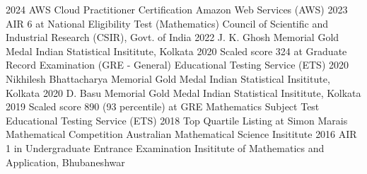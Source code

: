 \documentclass[9pt]{developercv} %
\begin{document}
\begin{entrylist}
    \vspace*{-0.5cm}
    \entry
    {2024}
    {AWS Cloud Practitioner Certification}
    {Amazon Web Services (AWS)}
    {}
    \vspace*{-0.5cm}
    \entry
    {2023}
    {AIR 6 at National Eligibility Test (Mathematics)}
    {Council of Scientific and Industrial Research (CSIR), Govt. of India}
    {}
    \vspace*{-0.5cm}
    \entry
    {2022}
    {J. K. Ghosh Memorial Gold Medal}
    {Indian Statistical Insititute, Kolkata}
    {}
    \vspace*{-0.5cm}
    \entry
    {2020}
    {Scaled score 324 at Graduate Record Examination (GRE - General)}
    {Educational Testing Service (ETS)}
    {}
    \vspace*{-0.5cm}
    \entry
    {2020}
    {Nikhilesh Bhattacharya Memorial Gold Medal}
    {Indian Statistical Insititute, Kolkata}
    {}
    \vspace*{-0.5cm}
    \entry
    {2020}
    {D. Basu Memorial Gold Medal}
    {Indian Statistical Insititute, Kolkata}
    {}
    \vspace*{-0.5cm}
    \entry
    {2019}
    {Scaled score 890 (93 percentile) at GRE Mathematics Subject Test}
    {Educational Testing Service (ETS)}
    {}
    \vspace*{-0.5cm}
    \entry
    {2018}
    {Top Quartile Listing at Simon Marais Mathematical Competition}
    {Australian Mathematical Science Insititute}
    {}
    \vspace*{-0.5cm}
    \entry
    {2016}
    {AIR 1 in Undergraduate Entrance Examination}
    {Insititute of Mathematics and Application, Bhubaneshwar}
    {}
\end{entrylist}



\vspace{-6pt}
\end{document}
